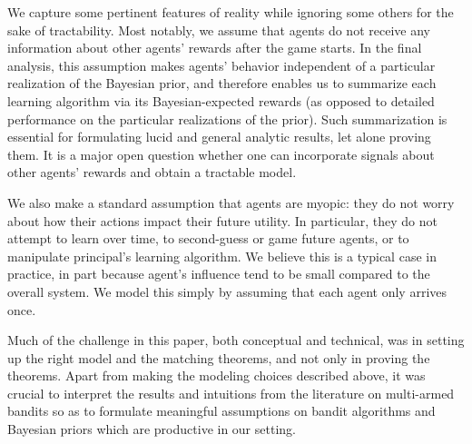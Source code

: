 
 We capture some pertinent features of reality while ignoring some others for the sake of tractability. Most notably, we assume that agents do not receive any information about other agents' rewards after the game starts. In the final analysis, this assumption makes agents' behavior independent of a particular realization of the Bayesian prior, and therefore enables us to summarize each learning algorithm via its Bayesian-expected rewards (as opposed to detailed performance on the particular realizations of the prior). Such summarization is essential for formulating lucid and general analytic results, let alone proving them. It is a major open question whether one can incorporate signals about other agents' rewards and obtain a tractable model.

We also make a standard assumption that agents are myopic: they do not worry about how their actions impact their future utility. In particular, they do not attempt to learn over time, to second-guess or game future agents, or to manipulate principal's learning algorithm. We believe this is a typical case in practice, in part because agent's influence tend to be small compared to the overall system. We model this simply by assuming that each agent only arrives once.

Much of the challenge in this paper, both conceptual and technical, was in setting up the right model and the matching theorems, and not only in proving the theorems. Apart from making the modeling choices described above, it was crucial to interpret the results and intuitions from the literature on multi-armed bandits so as to formulate meaningful assumptions on bandit algorithms and Bayesian priors which are productive in our setting.



